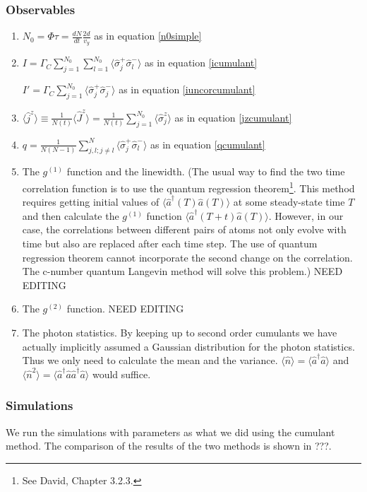 \documentclass{article}
\newcommand{\gc}{\Gamma_C}
\begin{document}
\subsubsection{Observables}
\begin{enumerate}
    \item $N_0 =\Phi\tau=\frac{dN}{dt}\frac{2d}{v_y}$ as in equation \ref{n0simple}
    \item $I = \gc\sum_{j=1}^{N_0}\sum_{l=1}^{N_0}\langle \hat{\sigma}_j^+\hat{\sigma}_l^-\rangle$ as in equation \ref{icumulant}
    
          $I'=\gc\sum_{j=1}^{N_0}\langle \hat{\sigma}_j^+\hat{\sigma}_j^-\rangle$ as in equation \ref{iuncorcumulant}
    \item $\langle\hat{j}^z\rangle\equiv\frac{1}{N(t)}\langle\hat{J}^z\rangle=\frac{1}{N(t)}\sum_{j=1}^{N_0}\langle\hat{\sigma}_j^z\rangle$ as in equation \ref{jzcumulant}
    \item $q=\frac{1}{N(N-1)}\sum_{j,l; j\neq l}^{N}\langle \hat{\sigma}_j^+\hat{\sigma}_l^-\rangle$ as in equation \ref{qcumulant}
    \item The $g^{(1)}$ function and the linewidth. (The usual way to find the two time correlation function is to use the quantum regression theorem\footnote{See David, Chapter 3.2.3.}. This method requires getting initial values of $\langle \hat{a}^\dagger(T) \hat{a}(T) \rangle$ at some steady-state time $T$ and then calculate the $g^{(1)}$ function $\langle \hat{a}^\dagger(T+t) \hat{a}(T)\rangle$. However, in our case, the correlations between different pairs of atoms not only evolve with time but also are replaced after each time step. The use of quantum regression theorem cannot incorporate the second change on the correlation. The c-number quantum Langevin method will solve this problem.) NEED EDITING
    \item The $g^{(2)}$ function. NEED EDITING
    \item The photon statistics. By keeping up to second order cumulants we have actually implicitly assumed a Gaussian distribution for the photon statistics. Thus we only need to calculate the mean and the variance. $\langle \hat{n}\rangle=\langle\hat{a}^\dagger \hat{a}\rangle$ and $\langle \hat{n}^2\rangle=\langle \hat{a}^\dagger\hat{a}\hat{a}^\dagger\hat{a}\rangle$ would suffice.
    
\end{enumerate}
\subsubsection{Simulations}
We run the simulations with parameters as what we did using the cumulant method. The comparison of the results of the two methods is shown in ???. 
\end{document}
